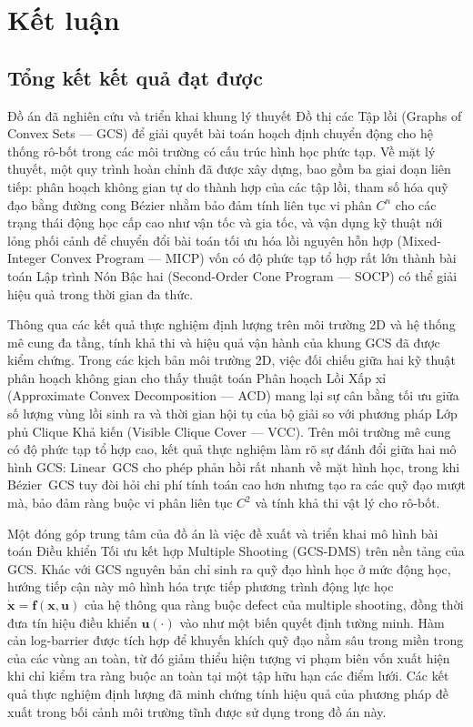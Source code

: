 \chapter{Kết luận}

\section{Tổng kết kết quả đạt được}
\label{sec:conclusion_summary}

Đồ án đã nghiên cứu và triển khai khung lý thuyết Đồ thị các Tập lồi
(Graphs of Convex Sets --- GCS) để giải quyết bài toán hoạch định chuyển
động cho hệ thống rô-bốt trong các môi trường có cấu trúc hình học phức tạp.
Về mặt lý thuyết, một quy trình hoàn chỉnh đã được xây dựng, bao gồm ba giai
đoạn liên tiếp: phân hoạch không gian tự do thành hợp của các tập lồi, tham
số hóa quỹ đạo bằng đường cong Bézier nhằm bảo đảm tính liên tục vi phân
$C^n$ cho các trạng thái động học cấp cao như vận tốc và gia tốc, và vận dụng
kỹ thuật nới lỏng phối cảnh để chuyển đổi bài toán tối ưu hóa lồi nguyên hỗn
hợp (Mixed-Integer Convex Program --- MICP) vốn có độ phức tạp tổ hợp rất
lớn thành bài toán Lập trình Nón Bậc hai (Second-Order Cone Program ---
SOCP) có thể giải hiệu quả trong thời gian đa thức.

Thông qua các kết quả thực nghiệm định lượng trên môi trường 2D và hệ thống mê
cung đa tầng, tính khả thi và hiệu quả vận hành của khung GCS đã được kiểm
chứng. Trong các kịch bản môi trường 2D, việc đối chiếu giữa hai kỹ thuật phân
hoạch không gian cho thấy thuật toán Phân hoạch Lồi Xấp xỉ (Approximate Convex
Decomposition --- ACD) mang lại sự cân bằng tối ưu giữa số lượng vùng lồi sinh
ra và thời gian hội tụ của bộ giải so với phương pháp Lớp phủ Clique Khả kiến
(Visible Clique Cover --- VCC). Trên môi trường mê cung có độ phức tạp tổ hợp
cao, kết quả thực nghiệm làm rõ sự đánh đổi giữa hai mô hình GCS: Linear~GCS
cho phép phản hồi rất nhanh về mặt hình học, trong khi Bézier~GCS tuy đòi hỏi
chi phí tính toán cao hơn nhưng tạo ra các quỹ đạo mượt mà, bảo đảm ràng buộc
vi phân liên tục $C^2$ và tính khả thi vật lý cho rô-bốt.

Một đóng góp trung tâm của đồ án là việc đề xuất và triển khai mô hình bài toán
Điều khiển Tối ưu kết hợp Multiple Shooting (GCS-DMS) trên nền tảng của GCS.
Khác với GCS nguyên bản chỉ sinh ra quỹ đạo hình học ở mức động học, hướng tiếp
cận này mô hình hóa trực tiếp phương trình động lực học $\dot{\mathbf{x}} =
    \mathbf{f}(\mathbf{x}, \mathbf{u})$ của hệ thông qua ràng buộc defect của
multiple shooting, đồng thời đưa tín hiệu điều khiển $\mathbf{u}(\cdot)$ vào
như một biến quyết định tường minh. Hàm cản log-barrier được tích hợp để khuyến
khích quỹ đạo nằm sâu trong miền trong của các vùng an toàn, từ đó giảm thiểu
hiện tượng vi phạm biên vốn xuất hiện khi chỉ kiểm tra ràng buộc an toàn tại
một tập hữu hạn các điểm lưới. Các kết quả thực nghiệm định lượng đã minh chứng
tính hiệu quả của phương pháp đề xuất trong bối cảnh môi trường tĩnh được sử
dụng trong đồ án này.

